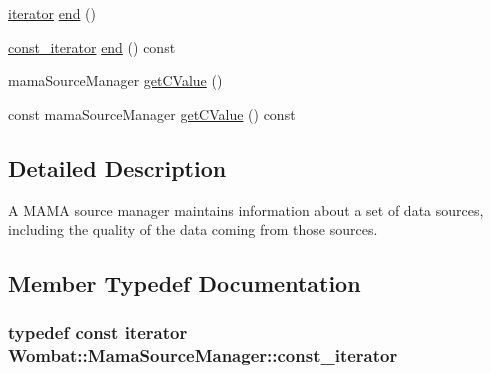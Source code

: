 \begin{DoxyCompactItemize}
\hyperlink{classWombat_1_1MamaSourceManager_1_1iterator}{iterator} \hyperlink{classWombat_1_1MamaSourceManager_ab981045963d421d19eaa00c07b50294e}{end} ()
\item 
\hyperlink{classWombat_1_1MamaSourceManager_1_1iterator}{const\_\-iterator} \hyperlink{classWombat_1_1MamaSourceManager_a453faf1ec11acd2184d21f8bb797fbf1}{end} () const 
\item 
mamaSourceManager \hyperlink{classWombat_1_1MamaSourceManager_ac3c7d7a8d70fde45f6a45caa669c88e7}{getCValue} ()
\item 
const mamaSourceManager \hyperlink{classWombat_1_1MamaSourceManager_aea217b2281827fd1d3abfb49062b8c46}{getCValue} () const 
\end{DoxyCompactItemize}


\subsection{Detailed Description}
A MAMA source manager maintains information about a set of data sources, including the quality of the data coming from those sources. 

\subsection{Member Typedef Documentation}
\hypertarget{classWombat_1_1MamaSourceManager_a3b80b1f2c1dc79abc9d8b77e839a613c}{
\subsubsection[{const\_\-iterator}]{\setlength{\rightskip}{0pt plus 5cm}typedef const {\bf iterator} {\bf Wombat::MamaSourceManager::const\_\-iterator}}}
\label{classWombat_1_1MamaSourceManager_a3b80b1f2c1dc79abc9d8b77e839a613c}


